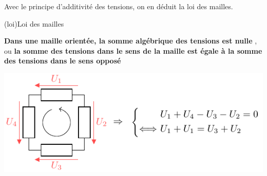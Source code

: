 \documentclass[../../main/main.tex]{subfiles}
\begin{document}
Avec le principe d'additivité des tensions, on en déduit la loi des mailles.
\begin{tcb}[label=loi:mailles, sidebyside, halign upper=center](loi){Loi des mailles}

	\textbf{Dans une maille orientée, la somme algébrique des tensions est nulle
	}, ou \textbf{la somme des tensions dans le sens de la maille est égale à la
		somme des tensions dans le sens opposé}
	\tcblower
	\begin{center}
		\includegraphics[width=\linewidth]{ldm}
	\end{center}
\end{tcb}
\end{document}

